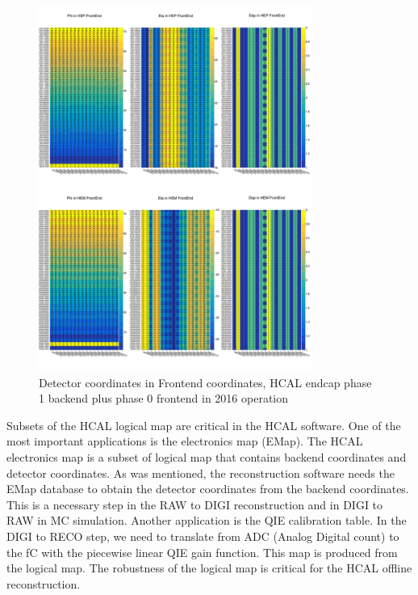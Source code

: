 \begin{figure}[htbp]
 \begin{center}
  \includegraphics[width=0.8\textwidth]{figures/c3/c3_cms_hcalhelmapfegeo.png}
 \end{center}
 \caption{Detector coordinates in Frontend coordinates, HCAL endcap phase 1 backend plus phase 0 frontend in 2016 operation}
 \label{fig:c3cmshcalhelmapfegeo}
\end{figure}


Subsets of the HCAL logical map are critical in the HCAL software. One of the most important applications is the electronics map (EMap). The HCAL electronics map is a subset of logical map that contains backend coordinates and detector coordinates. As was mentioned, the reconstruction software needs the EMap database to obtain the detector coordinates from the backend coordinates. This is a necessary step in the RAW to DIGI reconstruction and in DIGI to RAW in MC simulation. Another application is the QIE calibration table. In the DIGI to RECO step, we need to translate from ADC (Analog Digital count) to the fC with the piecewise linear QIE gain function. This map is produced from the logical map. The robustness of the logical map is critical for the HCAL offline reconstruction. 

